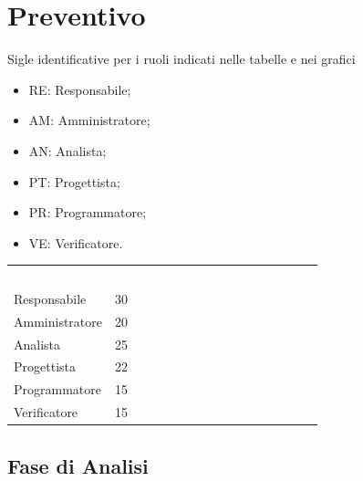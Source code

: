 \section{Preventivo}
Sigle identificative per i ruoli indicati nelle tabelle e nei grafici
\begin{itemize}
    \item RE: Responsabile;
    \item AM: Amministratore;
    \item AN: Analista;
    \item PT: Progettista;
    \item PR: Programmatore;
    \item VE: Verificatore.
\end{itemize}
{
	
	\renewcommand{\arraystretch}{2}
	
	\begin{table}[h!]
		\caption{  rappresenta il costo orario associato a ciascun ruolo}
		\label{table:5}		
		\centering
		\begin{longtable}{ C{2cm} C{3cm}}
			\textcolor{white}{\textbf{Ruolo}} & \textcolor{white}{\textbf{Costo per ora espresso in euro}}\\	
			
			Responsabile & 30\\
			Amministratore & 20\\
			Analista & 25\\
			Progettista & 22\\
			Programmatore & 15\\
			Verificatore & 15\\
			
		\end{longtable}
		
	
	\end{table}

}

\subsection{Fase di Analisi}

